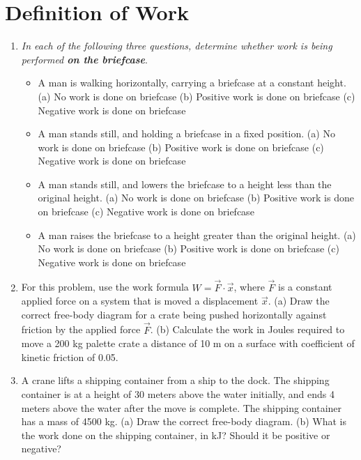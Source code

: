 \documentclass[10pt]{article}
\begin{document}
\maketitle

\section{Definition of Work}
\begin{enumerate}
\item \textit{In each of the following three questions, determine whether work is being performed \textbf{on the briefcase}}.
\begin{itemize}
\item A man is walking horizontally, carrying a briefcase at a constant height. (a) No work is done on briefcase (b) Positive work is done on briefcase (c) Negative work is done on briefcase
\item A man stands still, and holding a briefcase in a fixed position.  (a) No work is done on briefcase (b) Positive work is done on briefcase (c) Negative work is done on briefcase
\item A man stands still, and lowers the briefcase to a height less than the original height.  (a) No work is done on briefcase (b) Positive work is done on briefcase (c) Negative work is done on briefcase
\item A man raises the briefcase to a height greater than the original height.  (a) No work is done on briefcase (b) Positive work is done on briefcase (c) Negative work is done on briefcase
\end{itemize}
\item For this problem, use the work formula $W = \vec{F} \cdot \vec{x}$, where $\vec{F}$ is a constant applied force on a system that is moved a displacement $\vec{x}$.  (a) Draw the correct free-body diagram for a crate being pushed horizontally against friction by the applied force $\vec{F}$.  (b) Calculate the work in Joules required to move a 200 kg palette crate a distance of 10 m on a surface with coefficient of kinetic friction of 0.05. \\ \vspace{2cm}
\item A crane lifts a shipping container from a ship to the dock.  The shipping container is at a height of 30 meters above the water initially, and ends 4 meters above the water after the move is complete.  The shipping container has a mass of 4500 kg.  (a) Draw the correct free-body diagram.  (b) What is the work done on the shipping container, in kJ?  Should it be positive or negative? \\ \vspace{2cm}
\end{enumerate}
\end{document}
